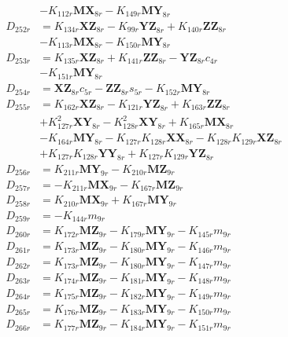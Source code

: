 \begin{multicols}{2}
\begin{align}
&- K_{112r}\mathbf{MX}_{8r} - K_{149r}\mathbf{MY}_{8r} \nonumber \\
D_{252r} &= K_{134r}\mathbf{XZ}_{8r} - K_{99r}\mathbf{YZ}_{8r} + K_{140r}\mathbf{ZZ}_{8r}  \nonumber \\
&- K_{113r}\mathbf{MX}_{8r} - K_{150r}\mathbf{MY}_{8r} \nonumber \\
D_{253r} &= K_{135r}\mathbf{XZ}_{8r} + K_{141r}\mathbf{ZZ}_{8r} - \mathbf{YZ}_{8r}c_{4r}  \nonumber \\
&- K_{151r}\mathbf{MY}_{8r} \nonumber \\
D_{254r} &= \mathbf{XZ}_{8r}c_{5r} - \mathbf{ZZ}_{8r}s_{5r} - K_{152r}\mathbf{MY}_{8r} \nonumber \\
D_{255r} &= K_{162r}\mathbf{XZ}_{8r} - K_{121r}\mathbf{YZ}_{8r} + K_{163r}\mathbf{ZZ}_{8r}  \nonumber \\
&+ K_{127r}^2\mathbf{XY}_{8r} - K_{128r}^2\mathbf{XY}_{8r} + K_{165r}\mathbf{MX}_{8r}  \nonumber \\
&- K_{164r}\mathbf{MY}_{8r} - K_{127r}K_{128r}\mathbf{XX}_{8r} - K_{128r}K_{129r}\mathbf{XZ}_{8r}  \nonumber \\
&+ K_{127r}K_{128r}\mathbf{YY}_{8r} + K_{127r}K_{129r}\mathbf{YZ}_{8r} \nonumber \\
D_{256r} &= K_{211r}\mathbf{MY}_{9r} - K_{210r}\mathbf{MZ}_{9r} \nonumber \\
D_{257r} &= - K_{211r}\mathbf{MX}_{9r} - K_{167r}\mathbf{MZ}_{9r} \nonumber \\
D_{258r} &= K_{210r}\mathbf{MX}_{9r} + K_{167r}\mathbf{MY}_{9r} \nonumber \\
D_{259r} &= -K_{144r}m_{9r} \nonumber \\
D_{260r} &= K_{172r}\mathbf{MZ}_{9r} - K_{179r}\mathbf{MY}_{9r} - K_{145r}m_{9r} \nonumber \\
D_{261r} &= K_{173r}\mathbf{MZ}_{9r} - K_{180r}\mathbf{MY}_{9r} - K_{146r}m_{9r} \nonumber \\
D_{262r} &= K_{173r}\mathbf{MZ}_{9r} - K_{180r}\mathbf{MY}_{9r} - K_{147r}m_{9r} \nonumber \\
D_{263r} &= K_{174r}\mathbf{MZ}_{9r} - K_{181r}\mathbf{MY}_{9r} - K_{148r}m_{9r} \nonumber \\
D_{264r} &= K_{175r}\mathbf{MZ}_{9r} - K_{182r}\mathbf{MY}_{9r} - K_{149r}m_{9r} \nonumber \\
D_{265r} &= K_{176r}\mathbf{MZ}_{9r} - K_{183r}\mathbf{MY}_{9r} - K_{150r}m_{9r} \nonumber \\
D_{266r} &= K_{177r}\mathbf{MZ}_{9r} - K_{184r}\mathbf{MY}_{9r} - K_{151r}m_{9r} \nonumber \\

\end{align}
\end{multicols}
